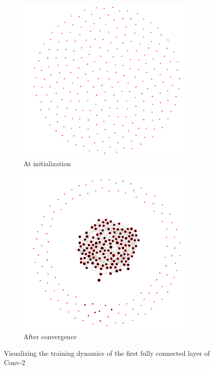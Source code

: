 \begin{figure}[H]
\centering
\begin{subfigure}[b]{0.62\textwidth}
   \includegraphics[width=\linewidth]{images/conv2-fc1-init.png}
   \caption{At initialization}
   \label{fig:conv2-fc1-init} 
\end{subfigure}

\begin{subfigure}[b]{0.62\textwidth}
   \includegraphics[width=\linewidth]{images/conv2-fc1-final.png}
   \caption{After convergence}
   \label{fig:conv2-fc1-final}
\end{subfigure}
\caption{Visualizing the training dynamics of the first fully connected layer of Conv-2}
\end{figure}

